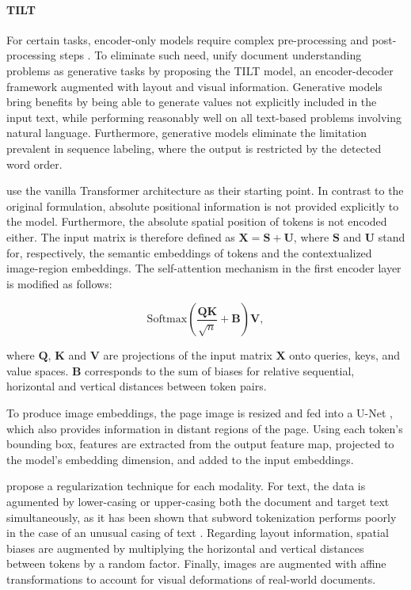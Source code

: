 \paragraph{TILT} 

For certain tasks, encoder-only models require complex pre-processing and post-processing steps \citep{gralinski2020kleister}. To eliminate such need, \citet{powalski2021going} unify document understanding problems as generative tasks by proposing the TILT model, an encoder-decoder framework augmented with layout and visual information. Generative models bring benefits by being able to generate values not explicitly included in the input text, while performing reasonably well on all text-based problems involving natural language. Furthermore, generative models eliminate the limitation prevalent in sequence labeling, where the output is restricted by the detected word order. 

\citet{powalski2021going} use the vanilla Transformer architecture as their starting point. In contrast to the original formulation, absolute positional information is not provided explicitly to the model. Furthermore, the absolute spatial position of tokens is not encoded either. The input matrix is therefore defined as $\bm{X} = \bm{S} + \bm{U}$, where $\bm{S}$ and $\bm{U}$ stand for, respectively, the semantic embeddings of tokens and the contextualized image-region embeddings. The self-attention mechanism in the first encoder layer is modified as follows:

\begin{equation}
    \text{Softmax}\left(\dfrac{\bm{Q}\bm{K}}{\sqrt{n}} + \bm{B}\right) \bm{V},
\end{equation}

\noindent where $\bm{Q}$, $\bm{K}$ and $\bm{V}$ are projections of the input matrix $\bm{X}$ onto queries, keys, and value spaces. $\bm{B}$ corresponds to the sum of biases for relative sequential, horizontal and vertical distances between token pairs.

To produce image embeddings, the page image is resized and fed into a U-Net \citep{ronneberger2015u}, which also provides information in distant regions of the page. Using each token's bounding box, features are extracted from the output feature map, projected to the model's embedding dimension, and added to the input embeddings.

\citet{powalski2021going} propose a regularization technique for each modality. For text, the data is agumented by lower-casing or upper-casing both the document and target text simultaneously, as it has been shown that subword tokenization performs poorly in the case of an unusual casing of text \citep{powalski2020unicase}. Regarding layout information, spatial biases are augmented by multiplying the horizontal and vertical distances between tokens by a random factor. Finally, images are augmented with affine transformations to account for visual deformations of real-world documents. 

